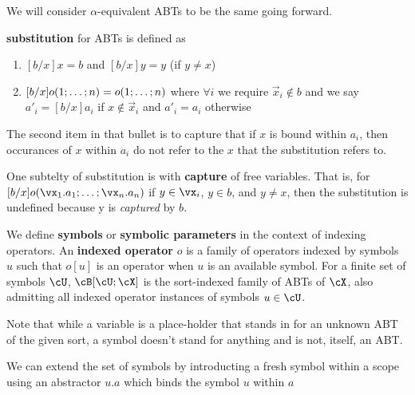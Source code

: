 \documentclass[11pt]{book}
\begin{document}
We will consider $\alpha$-equivalent ABTs to be the same going forward.

\br

\textbf{substitution} for ABTs is defined as 
\begin{enumerate}
    \item $[b/x]x=b$ and $[b/x]y=y$ (if $y \neq x$)
    \item $[b/x]\abtOperatorInstance=\abtOperatorInstancePrimeb$ where $\forall i$ we require $\vec{x}_i \notin b$ and we say $a'_i=[b/x]a_i$ if $x \notin \vec{x}_i$ and $a'_i=a_i$ otherwise
\end{enumerate}

The second item in that bullet is to capture that if $x$ is bound within $a_i$, then occurances of $x$ within $a_i$ do not refer to the $x$ that the substitution refers to.

\br

One subtelty of substitution is with \textbf{capture} of free variables. That is, for $[b/x]o(\vx_1.a_1;\dots;\vx_n.a_n)$ if $y\in \vx_i$, $y \in b$, and $y \neq x$, then the substitution is undefined because y is \textit{captured} by $b$. 

We define \textbf{symbols} or \textbf{symbolic parameters} in the context of indexing operators. An \textbf{indexed operator} $o$ is a family of operators indexed by symbols $u$ such that $o[u]$ is an operator when $u$ is an available symbol. For a finite set of symbols $\cU$, $\cB[\cU;\cX]$ is the sort-indexed family of ABTs of $\cX$, also admitting all indexed operator instances of symbols $u \in \cU$.

Note that while a variable is a place-holder that stands in for an unknown ABT of the given sort, a symbol doesn't stand for anything and is not, itself, an ABT.

We can extend the set of symbols by introducting a fresh symbol within a scope using an abstractor $u.a$ which binds the symbol $u$ within $a$
\end{document}
